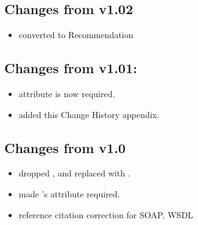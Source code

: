\documentclass[11pt,a4paper]{ivoa}
\begin{document}
\subsection{Changes from v1.02}
\begin{itemize}
  \item converted to Recommendation
\end{itemize}

\subsection{Changes from v1.01:}
\begin{itemize}
  \item {} attribute is now required.
  \item added this Change History appendix.
\end{itemize}

\subsection{Changes from v1.0}
\begin{itemize}
  \item dropped ,  and replaced
       with .
  \item made 's  attribute
       required.
  \item reference citation correction for SOAP, WSDL
\end{itemize}




\end{document}
